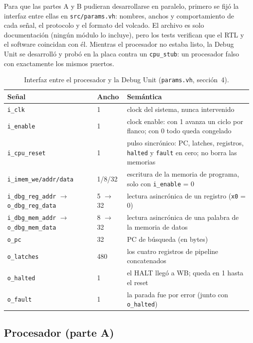 \documentclass[12pt,a4paper]{article}
\begin{document}
Para que las partes A y B pudieran desarrollarse en paralelo, primero se fijó
la interfaz entre ellas en \texttt{src/params.vh}: nombres, anchos y
comportamiento de cada señal, el protocolo y el formato del volcado. El archivo
es solo documentación (ningún módulo lo incluye), pero los tests verifican que
el RTL y el software coincidan con él. Mientras el procesador no estaba listo,
la Debug Unit se desarrolló y probó en la placa contra un \texttt{cpu\_stub}:
un procesador falso con exactamente los mismos puertos.

\begin{table}[H]
\centering
\small
\begin{tabular}{@{}L{5.2cm}lL{7.4cm}@{}}
\toprule
Señal & Ancho & Semántica \\
\midrule
\texttt{i\_clk} & 1 & clock del sistema, nunca intervenido \\
\texttt{i\_enable} & 1 & clock enable: con 1 avanza un ciclo por flanco; con 0 todo queda congelado \\
\texttt{i\_cpu\_reset} & 1 & pulso sincrónico: PC, latches, registros, \texttt{halted} y \texttt{fault} en cero; no borra las memorias \\
\texttt{i\_imem\_we/addr/data} & 1/8/32 & escritura de la memoria de programa, solo con \texttt{i\_enable} = 0 \\
\texttt{i\_dbg\_reg\_addr} $\rightarrow$ \texttt{o\_dbg\_reg\_data} & 5 $\rightarrow$ 32 & lectura asincrónica de un registro (\texttt{x0} = 0) \\
\texttt{i\_dbg\_mem\_addr} $\rightarrow$ \texttt{o\_dbg\_mem\_data} & 8 $\rightarrow$ 32 & lectura asincrónica de una palabra de la memoria de datos \\
\texttt{o\_pc} & 32 & PC de búsqueda (en bytes) \\
\texttt{o\_latches} & 480 & los cuatro registros de pipeline concatenados \\
\texttt{o\_halted} & 1 & el HALT llegó a WB; queda en 1 hasta el reset \\
\texttt{o\_fault} & 1 & la parada fue por error (junto con \texttt{o\_halted}) \\
\bottomrule
\end{tabular}
\caption{Interfaz entre el procesador y la Debug Unit (\texttt{params.vh}, sección~4).}
\end{table}

\subsection{Procesador (parte A)}
\end{document}
